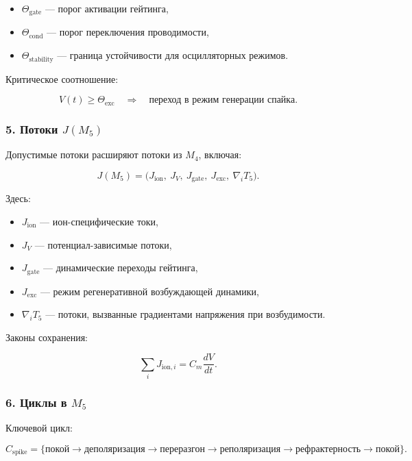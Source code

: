 \begin{itemize}
    \item $\Theta_{\mathrm{gate}}$ — порог активации гейтинга,
    \item $\Theta_{\mathrm{cond}}$ — порог переключения проводимости,
    \item $\Theta_{\mathrm{stability}}$ — граница устойчивости для осцилляторных режимов.
\end{itemize}

Критическое соотношение:

\[
V(t) \ge \Theta_{\mathrm{exc}} \quad\Rightarrow\quad
\text{переход в режим генерации спайка}.
\]

\subsubsection*{5. Потоки \texorpdfstring{$J(M_5)$}{J(M_5)}}

Допустимые потоки расширяют потоки из $M_4$, включая:

\[
J(M_5) =
\big(
J_{\mathrm{ion}},\
J_V,\
J_{\mathrm{gate}},\
J_{\mathrm{exc}},\
\nabla_i T_5
\big).
\]

Здесь:

\begin{itemize}
    \item $J_{\mathrm{ion}}$ — ион-специфические токи,
    \item $J_V$ — потенциал-зависимые потоки,
    \item $J_{\mathrm{gate}}$ — динамические переходы гейтинга,
    \item $J_{\mathrm{exc}}$ — режим регенеративной возбуждающей динамики,
    \item $\nabla_i T_5$ — потоки, вызванные градиентами напряжения при возбудимости.
\end{itemize}

Законы сохранения:

\[
\sum_i J_{\mathrm{ion},i} = C_m \frac{dV}{dt}.
\]

\subsubsection*{6. Циклы в \texorpdfstring{$M_5$}{M_5}}

Ключевой цикл:

\[
C_{\mathrm{spike}}
=
\{\text{покой} \to \text{деполяризация} \to
\text{переразгон} \to \text{реполяризация} \to \text{рефрактерность} \to \text{покой}\}.
\]

